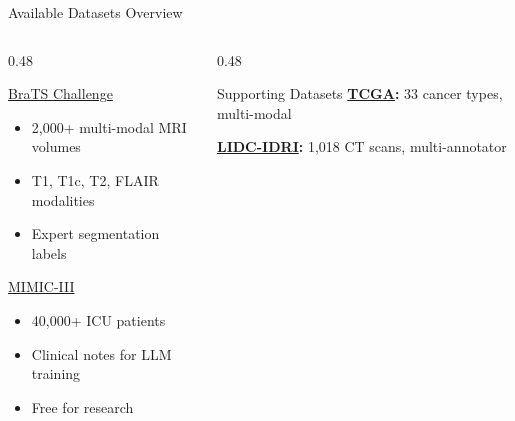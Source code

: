 \documentclass[aspectratio=169,xcolor=dvipsnames]{beamer}
\begin{document}
\begin{frame}{Available Datasets Overview}
    \begin{columns}
        \begin{column}{0.48\textwidth}
            \begin{block}{\href{https://www.synapse.org/brats}{BraTS Challenge}}
                \small
                \begin{itemize}\setlength{\itemsep}{1pt}
                    \item 2,000+ multi-modal MRI volumes
                    \item T1, T1c, T2, FLAIR modalities
                    \item Expert segmentation labels
                \end{itemize}
            \end{block}
            
            \begin{block}{\href{https://physionet.org/content/mimiciii/}{MIMIC-III}}
                \small
                \begin{itemize}\setlength{\itemsep}{1pt}
                    \item 40,000+ ICU patients
                    \item Clinical notes for LLM training
                    \item Free for research
                \end{itemize}
            \end{block}
        \end{column}
        
        \begin{column}{0.48\textwidth}
            \begin{block}{Supporting Datasets}
                \small
                \textbf{\href{https://portal.gdc.cancer.gov/}{TCGA}:} 33 cancer types, multi-modal
                
                \vspace{0.2em}
                
                \textbf{\href{https://wiki.cancerimagingarchive.net/display/Public/LIDC-IDRI}{LIDC-IDRI}:} 1,018 CT scans, multi-annotator
            \end{block}
            
        \end{column}
    \end{columns}
\end{frame}
\end{document}

